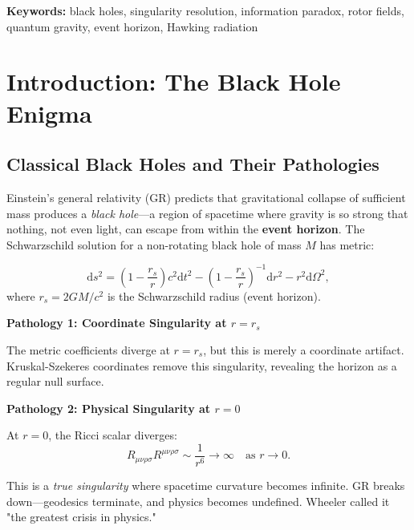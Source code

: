 \documentclass[11pt,a4paper]{article}
\numberwithin{equation}{section}
\theoremstyle{plain}
\theoremstyle{definition}
\theoremstyle{remark}
\renewcommand{\dd}{\mathrm{d}}
\begin{document}
\noindent\textbf{Keywords:} black holes, singularity resolution, information paradox, rotor fields, quantum gravity, event horizon, Hawking radiation

\tableofcontents
\newpage


\section{Introduction: The Black Hole Enigma}
\label{sec:intro}

\subsection{Classical Black Holes and Their Pathologies}

Einstein's general relativity (GR) predicts that gravitational collapse of sufficient mass produces a \emph{black hole}—a region of spacetime where gravity is so strong that nothing, not even light, can escape from within the \textbf{event horizon}. The Schwarzschild solution for a non-rotating black hole of mass $M$ has metric:

\begin{equation}
\dd s^2 = \left(1 - \frac{r_s}{r}\right) c^2 \dd t^2 - \left(1 - \frac{r_s}{r}\right)^{-1} \dd r^2 - r^2 \dd\Omega^2,
\label{eq:schwarzschild}
\end{equation}
where $r_s = 2GM/c^2$ is the Schwarzschild radius (event horizon).

\textbf{Pathology 1: Coordinate Singularity at $r = r_s$}

The metric coefficients diverge at $r = r_s$, but this is merely a coordinate artifact. Kruskal-Szekeres coordinates remove this singularity, revealing the horizon as a regular null surface.

\textbf{Pathology 2: Physical Singularity at $r = 0$}

At $r=0$, the Ricci scalar diverges:
\begin{equation}
R_{\mu\nu\rho\sigma} R^{\mu\nu\rho\sigma} \sim \frac{1}{r^6} \to \infty \quad \text{as } r \to 0.
\end{equation}

This is a \emph{true singularity} where spacetime curvature becomes infinite. GR breaks down—geodesics terminate, and physics becomes undefined. Wheeler called it "the greatest crisis in physics."
\end{document}
